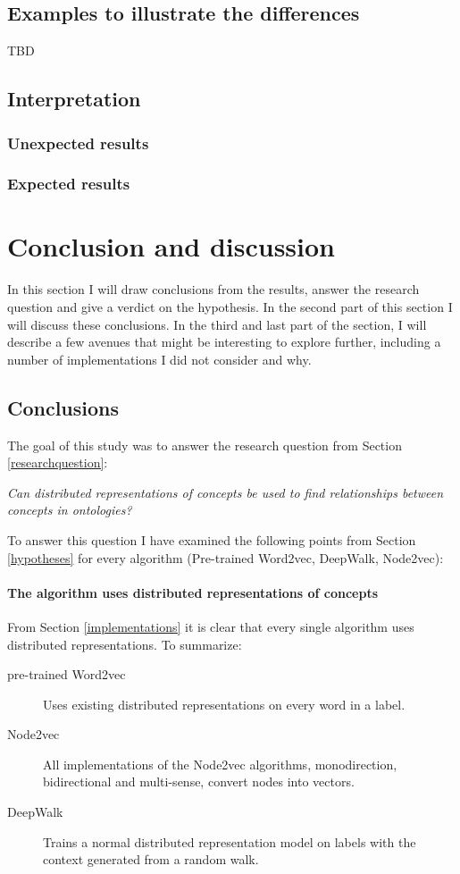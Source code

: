 \documentclass{article}
\begin{document}
  \subsection{Examples to illustrate the differences}
  TBD
   
 \newpage
 \subsection{Interpretation}
 \subsubsection{Unexpected results}
 \subsubsection{Expected results}
  
 \newpage
 \section{Conclusion and discussion}
 In this section I will draw conclusions from the results, answer the research question and give a verdict on the hypothesis. In the second part of this section I will discuss these conclusions. In the third and last part of the section, I will describe a few avenues that might be interesting to explore further, including a number of implementations I did not consider and why.
 
 \subsection{Conclusions} \label{conclusions}
 The goal of this study was to answer the research question from Section \ref{researchquestion}:

 \begin{center}
 \textit{
 Can distributed representations of concepts be used to find relationships between concepts in ontologies?
 }
 \end{center}
 
 To answer this question I have examined the following points from Section \ref{hypotheses} for every algorithm (Pre-trained Word2vec, DeepWalk, Node2vec):
 
\paragraph{The algorithm uses distributed representations of concepts}
 From Section \ref{implementations} it is clear that every single algorithm uses distributed representations. To summarize:
\begin{description}
\item[pre-trained Word2vec] Uses existing distributed representations on every word in a label.
\item[Node2vec] All implementations of the Node2vec algorithms, monodirection, bidirectional and multi-sense, convert nodes into vectors.
\item[DeepWalk] Trains a normal distributed representation model on labels with the context generated from a random walk.
\end{description}
\end{document}
